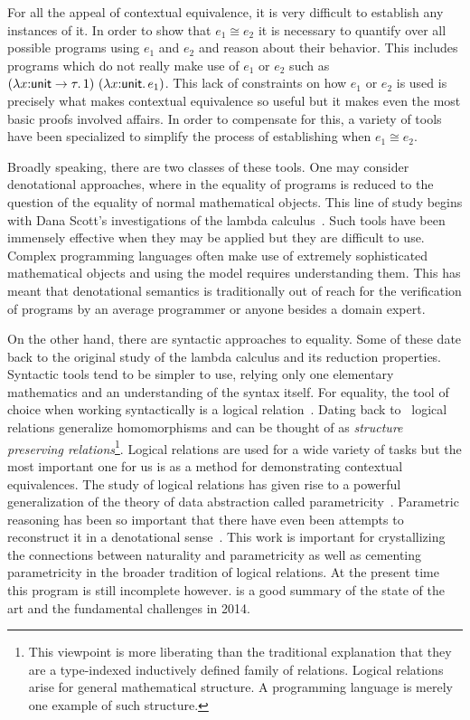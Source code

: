 For all the appeal of contextual equivalence, it is very difficult to
establish any instances of it. In order to show that
$e_1 \cong e_2$ it is necessary to quantify over all possible programs
using $e_1$ and $e_2$ and reason about their behavior. This includes
programs which do not really make use of $e_1$ or $e_2$ such as
$(\lambda x {:} \mathsf{unit} \to \tau.\, 1)\ (\lambda x {:} \mathsf{unit}.\, e_1)$. This lack
of constraints on how $e_1$ or $e_2$ is used is precisely what makes
contextual equivalence so useful but it makes even the most basic
proofs involved affairs. In order to compensate for this, a variety of
tools have been specialized to simplify the process of establishing when
$e_1 \cong e_2$.

Broadly speaking, there are two classes of these tools. One may
consider denotational approaches, where in the equality of programs is
reduced to the question of the equality of normal mathematical
objects. This line of study begins with Dana Scott's investigations of
the lambda calculus~\citep{Scott:76}. Such tools have been
immensely effective when they may be applied but they are difficult to
use. Complex programming languages often make use of extremely
sophisticated mathematical objects and using the model requires
understanding them. This has meant that denotational semantics is
traditionally out of reach for the verification of programs by an
average programmer or anyone besides a domain expert.

On the other hand, there are syntactic approaches to equality. Some of
these date back to the original study of the lambda calculus and its
reduction properties. Syntactic tools tend to be simpler to use,
relying only one elementary mathematics and an understanding of the
syntax itself. For equality, the tool of choice when working
syntactically is a logical
relation~\citep{Tait:67,Girard:72,Pitts:98,Appel:01,Ahmed:04,Ahmed:06,Appel:07,Dreyer:09,Dreyer:10}.
Dating back to~\citet{Tait:67} logical relations generalize
homomorphisms and can be thought of as \emph{structure preserving
  relations}\footnote{This viewpoint is more liberating than the
  traditional explanation that they are a type-indexed inductively
  defined family of relations. Logical relations arise for general
  mathematical structure. A programming language is merely one example
  of such structure.}. Logical relations are used for a wide variety
of tasks but the most important one for us is as a method for
demonstrating contextual equivalences. The study of logical relations
has given rise to a powerful generalization of the theory of data
abstraction called parametricity~\citep{Reynolds:83}. Parametric
reasoning has been so important that there have even been attempts to
reconstruct it in a denotational
sense~\citep{Bainbridge:90,Abadi:90,Ma:91,Birkedal:05,Dunphy:04}. This
work is important for crystallizing the connections between naturality
and parametricity as well as cementing parametricity in the broader
tradition of logical relations. At the present time this program is
still incomplete however. \citet{Hermida:14} is a good summary of the
state of the art and the fundamental challenges in 2014.

